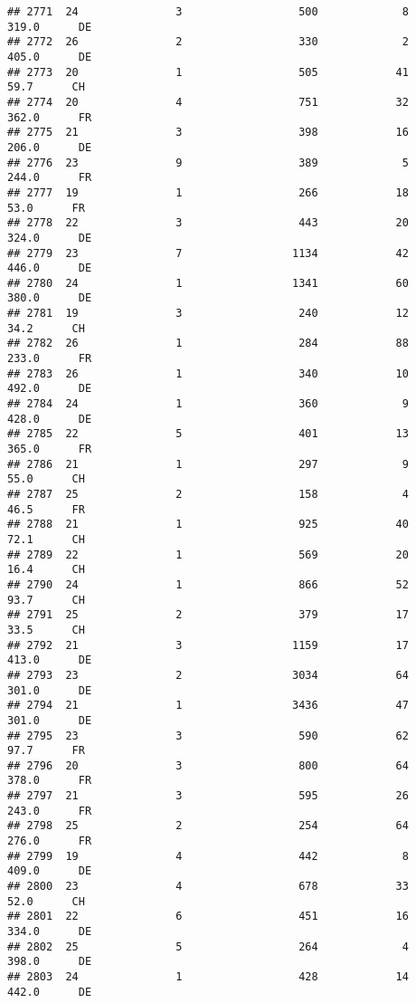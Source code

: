 \documentclass[
]{article}
\begin{document}
\begin{verbatim}
## 2771  24               3                  500             8    319.0      DE
## 2772  26               2                  330             2    405.0      DE
## 2773  20               1                  505            41     59.7      CH
## 2774  20               4                  751            32    362.0      FR
## 2775  21               3                  398            16    206.0      DE
## 2776  23               9                  389             5    244.0      FR
## 2777  19               1                  266            18     53.0      FR
## 2778  22               3                  443            20    324.0      DE
## 2779  23               7                 1134            42    446.0      DE
## 2780  24               1                 1341            60    380.0      DE
## 2781  19               3                  240            12     34.2      CH
## 2782  26               1                  284            88    233.0      FR
## 2783  26               1                  340            10    492.0      DE
## 2784  24               1                  360             9    428.0      DE
## 2785  22               5                  401            13    365.0      FR
## 2786  21               1                  297             9     55.0      CH
## 2787  25               2                  158             4     46.5      FR
## 2788  21               1                  925            40     72.1      CH
## 2789  22               1                  569            20     16.4      CH
## 2790  24               1                  866            52     93.7      CH
## 2791  25               2                  379            17     33.5      CH
## 2792  21               3                 1159            17    413.0      DE
## 2793  23               2                 3034            64    301.0      DE
## 2794  21               1                 3436            47    301.0      DE
## 2795  23               3                  590            62     97.7      FR
## 2796  20               3                  800            64    378.0      FR
## 2797  21               3                  595            26    243.0      FR
## 2798  25               2                  254            64    276.0      FR
## 2799  19               4                  442             8    409.0      DE
## 2800  23               4                  678            33     52.0      CH
## 2801  22               6                  451            16    334.0      DE
## 2802  25               5                  264             4    398.0      DE
## 2803  24               1                  428            14    442.0      DE

\end{verbatim}
\end{document}
